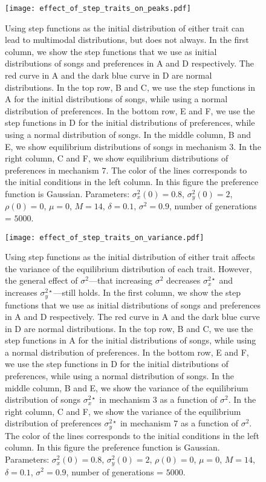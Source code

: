 \documentclass{article}
\begin{document}
\begin{figure}
\texttt{[image: effect\_of\_step\_traits\_on\_peaks.pdf]}
\caption{\label{effect_of_step_dist} Using step functions as the initial distribution of either trait can lead to multimodal distributions, but does not always. In the first column, we show the step functions that we use as initial distributions of songs and preferences in A and D respectively. The red curve in A and the dark blue curve in D are normal distributions. 
In the top row, B and C, we use the step functions in A for the initial distributions of songs, while using a normal distribution of preferences. In the bottom row, E and F, we use the step functions in D for the initial distributions of preferences, while using a normal distribution of songs.  In the middle column, B and E, we show equilibrium distributions of songs in mechanism $3$. In the right column, C and F, we show equilibrium distributions of preferences in mechanism $7$. The color of the lines corresponds to the initial conditions in the left column. In this figure the preference function is Gaussian. Parameters: $\sigma_x^2(0)=0.8$, $\sigma_y^2(0)=2$, $\rho(0)=0$, $\mu=0$, $M=14$, $\delta=0.1$, $\sigma^2=0.9$, number of generations = $5000$. }
\end{figure}

\begin{figure}
\texttt{[image: effect\_of\_step\_traits\_on\_variance.pdf]}
\caption{\label{effect_of_step_dist_on_prefs} Using step functions as the initial distribution of either trait affects the variance of the equilibrium distribution of each trait. However, the general effect of $\sigma^2$---that increasing $\sigma^2$ decreases $\sigma_x^{2\star}$ and increases $\sigma_y^{2\star}$---still holds. In the first column, we show the step functions that we use as initial distributions of songs and preferences in A and D respectively. The red curve in A and the dark blue curve in D are normal distributions. 
In the top row, B and C, we use the step functions in A for the initial distributions of songs, while using a normal distribution of preferences. In the bottom row, E and F, we use the step functions in D for the initial distributions of preferences, while using a normal distribution of songs.  In the middle column, B and E, we show the variance of the equilibrium distribution of songs $\sigma_x^{2\star}$ in mechanism $3$ as a function of $\sigma^2$. In the right column, C and F, we show the variance of the equilibrium distribution of preferences $\sigma_y^{2\star}$ in mechanism $7$ as a function of $\sigma^2$. The color of the lines corresponds to the initial conditions in the left column. In this figure the preference function is Gaussian. Parameters: $\sigma_x^2(0)=0.8$, $\sigma_y^2(0)=2$, $\rho(0)=0$, $\mu=0$, $M=14$, $\delta=0.1$, $\sigma^2=0.9$, number of generations = $5000$. }
\end{figure}
\end{document}
